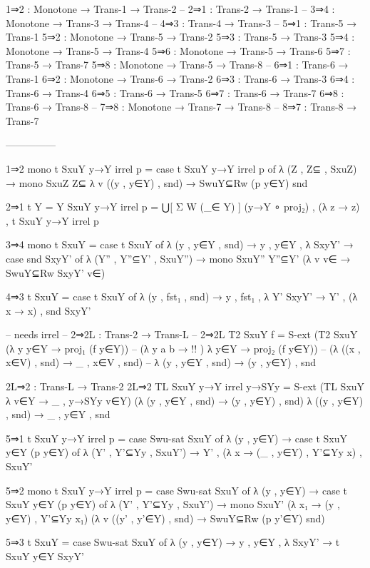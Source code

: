 \begin{spverbatim}
  1⇒2 : Monotone → Trans-1 → Trans-2
  --
  2⇒1 : Trans-2 → Trans-1
  --
  3⇒4 : Monotone → Trans-3 → Trans-4
  --
  4⇒3 : Trans-4 → Trans-3
  --
  5⇒1 : Trans-5 → Trans-1
  5⇒2 : Monotone → Trans-5 → Trans-2
  5⇒3 : Trans-5 → Trans-3
  5⇒4 : Monotone → Trans-5 → Trans-4
  5⇒6 : Monotone → Trans-5 → Trans-6
  5⇒7 : Trans-5 → Trans-7
  5⇒8 : Monotone → Trans-5 → Trans-8
  --
  6⇒1 : Trans-6 → Trans-1
  6⇒2 : Monotone → Trans-6 → Trans-2
  6⇒3 : Trans-6 → Trans-3
  6⇒4 : Trans-6 → Trans-4
  6⇒5 : Trans-6 → Trans-5
  6⇒7 : Trans-6 → Trans-7
  6⇒8 : Trans-6 → Trans-8
  --
  7⇒8 : Monotone → Trans-7 → Trans-8
  --
  8⇒7 : Trans-8 → Trans-7

  ---------------

  1⇒2 mono t SxuY y→Y irrel p = case t SxuY y→Y irrel p of
    λ { (Z , Z⊆ , SxuZ) → mono SxuZ Z⊆
    λ { {v} ((y , y∈Y) , snd) → SwuY⊆Rw (p y∈Y) snd}}

  2⇒1 t {Y = Y} SxuY y→Y irrel p = ⋃[ Σ W (_∈ Y) ] (y→Y ∘ proj₂) , (λ z → z) , t SxuY y→Y irrel p

  3⇒4 mono t SxuY = case t SxuY of
    λ { (y , y∈Y , snd) → y , y∈Y , λ {SxyY' → case snd SxyY' of
    λ { (Y'' , Y''⊆Y' , SxuY'') → mono SxuY'' Y''⊆Y' (λ { {v} v∈
    → SwuY⊆Rw SxyY' v∈})}}}

  4⇒3 t SxuY = case t SxuY of λ { (y , fst₁ , snd) → y , fst₁ ,
    λ { {Y'} SxyY' → Y' , (λ x → x) , snd SxyY'}}

  -- needs irrel
  -- 2⇒2L : Trans-2 → Trans-L
  -- 2⇒2L T2 SxuY f = S-ext (T2 SxuY (λ { {y} y∈Y → proj₁ (f y∈Y)})
  --   (λ { {y} {a} {b} → {!!} }) λ {y∈Y → proj₂ (f y∈Y)})
  --   (λ { ((x , x∈V) , snd) → _ , x∈V , snd})
  --   λ { (y , y∈Y , snd) → (y , y∈Y) , snd}

  2L⇒2 : Trans-L → Trans-2
  2L⇒2 TL SxuY y→Y irrel y→SYy = S-ext
    (TL SxuY λ {v∈Y → _ , y→SYy v∈Y})
    (λ { (y , y∈Y , snd) → (y , y∈Y) , snd})
    λ { ((y , y∈Y) , snd) → _ , y∈Y , snd}

  5⇒1 t SxuY y→Y irrel p = case Swu-sat SxuY of λ { (y , y∈Y)
    → case t SxuY y∈Y (p y∈Y) of λ { (Y' , Y'⊆Yy , SxuY') → Y' ,
    (λ {x → (_ , y∈Y) , Y'⊆Yy x}) , SxuY'}}

  5⇒2 mono t SxuY y→Y irrel p = case Swu-sat SxuY of λ { (y , y∈Y)
    → case t SxuY y∈Y (p y∈Y) of λ { (Y' , Y'⊆Yy , SxuY') →
    mono SxuY' (λ x₁ → (y , y∈Y) , Y'⊆Yy x₁)
    (λ { {v} ((y' , y'∈Y) , snd) → SwuY⊆Rw (p y'∈Y) snd})}}

  5⇒3 t SxuY = case Swu-sat SxuY of λ { (y , y∈Y) → y , y∈Y ,
    λ {SxyY' → t SxuY y∈Y SxyY'}}


\end{spverbatim}

